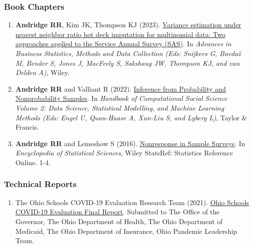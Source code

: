 \documentclass[
  english,
  letterpaper,
  DIV=11,
  numbers=noendperiod]{scrartcl}
\providecommand{\tightlist}{%
  \setlength{\itemsep}{0pt}\setlength{\parskip}{0pt}}
\begin{document}
\subsubsection{Book Chapters}\label{book-chapters}

\begin{enumerate}
\def\labelenumi{\arabic{enumi}.}
\tightlist
\item
  \textbf{Andridge RR}, Kim JK, Thompson KJ (2023).
  \href{https://doi.org/10.1002/9781119672333.ch31}{Variance estimation
  under nearest neighbor ratio hot deck imputation for multinomial data:
  Two approaches applied to the Service Annual Survey (SAS)}. In
  \emph{Advances in Business Statistics, Methods and Data Collection
  (Eds: Snijkers G, Bavdaž M, Bender S, Jones J, MacFeely S, Sakshaug
  JW, Thompson KJ, and van Delden A)}, Wiley.
\item
  \textbf{Andridge RR} and Valliant R (2022).
  \href{https://www.taylorfrancis.com/chapters/edit/10.4324/9781003025245-13/inference-probability-nonprobability-samples-rebecca-andridge-richard-valliant}{Inference
  from Probability and Nonprobability Samples}. In \emph{Handbook of
  Computational Social Science Volume 2: Data Science, Statistical
  Modelling, and Machine Learning Methods (Eds: Engel U, Quan-Haase A,
  Xun-Liu S, and Lyberg L)}, Taylor \& Francis.
\item
  \textbf{Andridge RR} and Lemeshow S (2016).
  \href{https://doi.org/10.1002/9781118445112.stat03338.pub2}{Nonresponse
  in Sample Surveys}. In \emph{Encyclopedia of Statistical Sciences},
  Wiley StatsRef: Statistics Reference Online. 1-4.
\end{enumerate}

\subsubsection{Technical Reports}\label{technical-reports}

\begin{enumerate}
\def\labelenumi{\arabic{enumi}.}
\tightlist
\item
  The Ohio Schools COVID-19 Evaluation Research Team (2021).
  \href{http://grc.osu.edu/sites/default/files/inline-files/OSCE\%20Final\%20Report\%202021.pdf}{Ohio
  Schools COVID-19 Evaluation Final Report}. Submitted to The Office of
  the Governor, The Ohio Department of Health, The Ohio Department of
  Medicaid, The Ohio Department of Insurance, Ohio Pandemic Leadership
  Team.
\end{enumerate}
\end{document}
